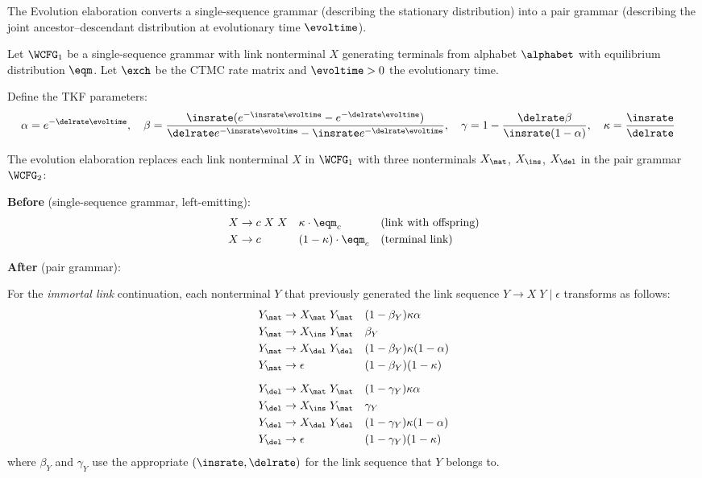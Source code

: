 The Evolution elaboration converts a single-sequence grammar
(describing the stationary distribution) into a pair grammar
(describing the joint ancestor--descendant distribution
at evolutionary time $\evoltime$).

\begin{definition}
\label{def:evolution-appendix}
Let $\WCFG_1$ be a single-sequence grammar with link nonterminal
$X$ generating terminals from alphabet $\alphabet$ with equilibrium
distribution $\eqm$.  Let $\exch$ be the CTMC rate matrix and
$\evoltime > 0$ the evolutionary time.

Define the TKF parameters:
\begin{align*}
\alpha &= e^{-\delrate \evoltime}, \quad
\beta = \frac{\insrate(e^{-\insrate\evoltime} - e^{-\delrate\evoltime})}
  {\delrate e^{-\insrate\evoltime} - \insrate e^{-\delrate\evoltime}}, \quad
\gamma = 1 - \frac{\delrate\beta}{\insrate(1-\alpha)}, \quad
\kappa = \frac{\insrate}{\delrate}
\end{align*}

The evolution elaboration replaces each link nonterminal $X$
in $\WCFG_1$ with three nonterminals $X_\mat$, $X_\ins$, $X_\del$
in the pair grammar $\WCFG_2$:

\medskip
\noindent\textbf{Before} (single-sequence grammar, left-emitting):
\begin{align*}
X &\to c\;X\;X && \kappa \cdot \eqm_c  && \text{(link with offspring)} \\
X &\to c        && (1-\kappa) \cdot \eqm_c  && \text{(terminal link)}
\end{align*}

\noindent\textbf{After} (pair grammar):

For the \emph{immortal link} continuation, each nonterminal
$Y$ that previously generated the link sequence
$Y \to X\;Y\;|\;\epsilon$ transforms as follows:
\begin{align*}
Y_\mat &\to X_\mat\;Y_\mat &&
  (1-\beta_Y)\kappa\alpha \\
Y_\mat &\to X_\ins\;Y_\mat &&
  \beta_Y \\
Y_\mat &\to X_\del\;Y_\del &&
  (1-\beta_Y)\kappa(1-\alpha) \\
Y_\mat &\to \epsilon &&
  (1-\beta_Y)(1-\kappa) \\[6pt]
Y_\del &\to X_\mat\;Y_\mat &&
  (1-\gamma_Y)\kappa\alpha \\
Y_\del &\to X_\ins\;Y_\mat &&
  \gamma_Y \\
Y_\del &\to X_\del\;Y_\del &&
  (1-\gamma_Y)\kappa(1-\alpha) \\
Y_\del &\to \epsilon &&
  (1-\gamma_Y)(1-\kappa) \\
\end{align*}
where $\beta_Y$ and $\gamma_Y$ use the appropriate $(\insrate, \delrate)$
for the link sequence that $Y$ belongs to.


\end{definition}
